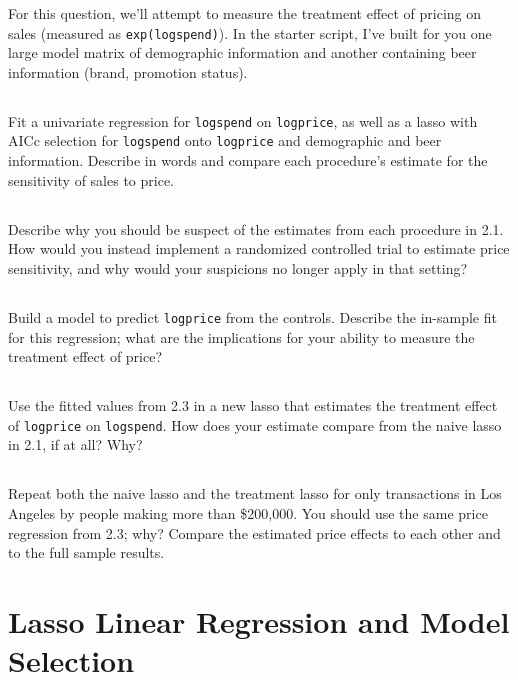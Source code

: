 \documentclass[12pt]{article}
\begin{document}
For this question, we'll attempt to measure the treatment effect of pricing on sales (measured as {\tt exp(logspend)}).  In the starter script, I've built for you one large model matrix of demographic information and another containing beer information (brand, promotion status).

\subsection{} Fit  a univariate regression for {\tt logspend} on {\tt logprice}, as well as a lasso with AICc selection for {\tt logspend} onto {\tt logprice} and demographic and beer information.
Describe in words and compare each procedure's estimate for the sensitivity of sales to price. 

\subsection{} Describe why you should be suspect of the estimates from each procedure in 2.1.  How would you instead implement a randomized controlled trial to estimate price sensitivity, and why would your suspicions no longer apply in that setting?

\subsection{} Build a model to predict {\tt logprice} from the controls.  Describe the in-sample fit for this regression; what are the implications for your ability to measure the treatment effect of price?

\subsection{}  Use the fitted values from 2.3 in a new lasso that estimates the treatment effect of {\tt logprice} on {\tt logspend}.  How does your estimate compare from the naive lasso in 2.1, if at all?  Why?

\subsection{} Repeat both the naive lasso and the treatment lasso for only transactions in Los Angeles by people making more than \$200,000.  You should use the same price regression from 2.3; why? Compare the estimated price effects to each other and to the full sample results.

\newpage
\section{Lasso Linear Regression and Model Selection}
\end{document}

